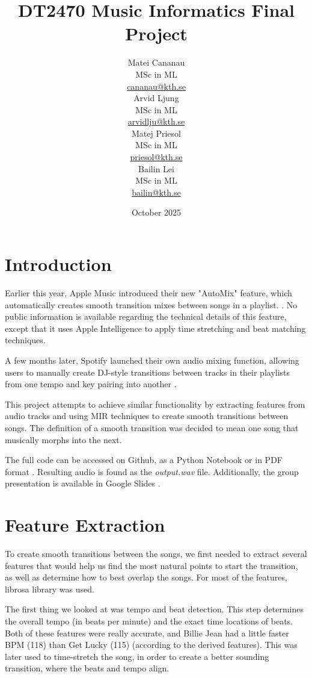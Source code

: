 \documentclass[14pt]{extarticle}
\title{DT2470 Music Informatics Final Project}
\date{October 2025}
\author{
    \begin{minipage}[t]{0.24\textwidth}
        \centering
        Matei Cananau \\
        MSc in ML \\
        \href{mailto:cananau@kth.se}{cananau@kth.se}
    \end{minipage}
    \hfill
    \begin{minipage}[t]{0.24\textwidth}
        \centering
        Arvid Ljung \\
        MSc in ML \\
        \href{mailto:arvidlju@kth.se}{arvidlju@kth.se}
    \end{minipage}
    \hfill
    \begin{minipage}[t]{0.24\textwidth}
        \centering
        Matej Priesol \\
        MSc in ML \\
        \href{mailto:priesol@kth.se}{priesol@kth.se}
    \end{minipage}
    \hfill
    \begin{minipage}[t]{0.24\textwidth}
        \centering
        Bailin Lei \\
        MSc in ML \\
        \href{mailto:bailin@kth.se}{bailin@kth.se}
    \end{minipage}
}
\begin{document}
\maketitle

\tableofcontents

\newpage

\section{Introduction}

Earlier this year, Apple Music introduced their new "AutoMix" feature, which automatically creates smooth transition mixes between songs in a playlist. \cite{apple2025}. No public information is available regarding the technical details of this feature, except that it uses Apple Intelligence to apply time stretching and beat matching techniques.

A few months later, Spotify launched their own audio mixing function, allowing users to manually create DJ-style transitions between tracks in their playlists from one tempo and key pairing into another \cite{spotify2025}.

This project attempts to achieve similar functionality by extracting features from audio tracks and using MIR techniques to create smooth transitions between songs. The definition of a smooth transition was decided to mean one song that musically morphs into the next.

The full code can be accessed on Github, as a Python Notebook or in PDF format \cite{github_repo}. Resulting audio is found as the \textit{output.wav} file. Additionally, the group presentation is available in Google Slides \cite{presentation}.

\section{Feature Extraction}

To create smooth transitions between the songs, we first needed to extract several features that would help us find the most natural points to start the transition, as well as determine how to best overlap the songs. For most of the features, librosa library was used.

The first thing we looked at was tempo and beat detection. This step determines the overall tempo (in beats per minute) and the exact time locations of beats. Both of these features were really accurate, and Billie Jean had a little faster BPM (118) than Get Lucky (115) (according to the derived features). This was later used to time-stretch the song, in order to create a better sounding transition, where the beats and tempo align.
\end{document}
